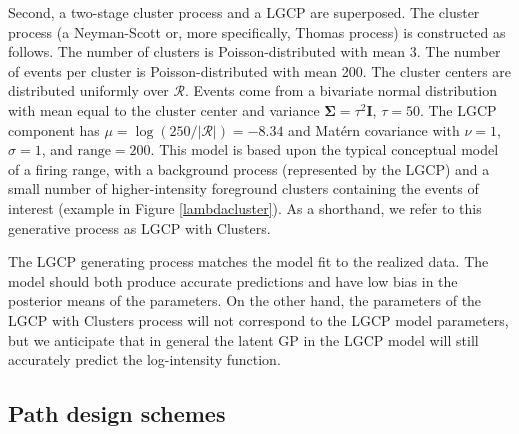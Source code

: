 \documentclass[review]{elsarticle}
\begin{document}
Second, a two-stage cluster process and a LGCP are superposed. The cluster
process (a Neyman-Scott or, more specifically, Thomas process) is constructed
as follows. The number of clusters is Poisson-distributed with mean 3. The
number of events per cluster is Poisson-distributed with mean 200. The cluster
centers are distributed uniformly over \(\mathcal{R}\). Events come from a
bivariate normal distribution with mean equal to the cluster center and
variance \(\boldsymbol{\Sigma} = \tau^{2}\mathbf{I}\), \(\tau = 50\). The LGCP
component has \(\mu = \log(250 / |\mathcal{R}|) = -8.34\) and Mat\'{e}rn
covariance with \(\nu = 1\), \(\sigma = 1\), and \(\text{range} = 200\). This
model is based upon the typical conceptual model of a firing range, with a
background process (represented by the LGCP) and a small number of
higher-intensity foreground clusters containing the events of interest
(example in Figure \ref{lambdacluster}). As a shorthand, we refer to this
generative process as LGCP with Clusters.

The LGCP generating process matches the model fit to the realized data. The
model should both produce accurate predictions and have low bias in the
posterior means of the parameters. On the other hand, the parameters of the
LGCP with Clusters process will not correspond to the LGCP model parameters,
but we anticipate that in general the latent GP in the LGCP model will still
accurately predict the log-intensity function.


\subsection{Path design schemes}
\label{simschemes}
\end{document}
